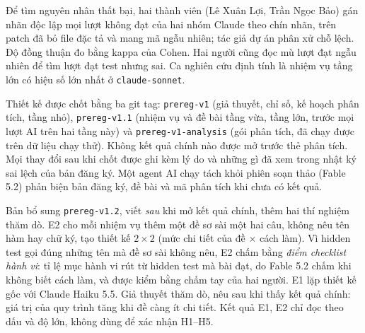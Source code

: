 Để tìm nguyên nhân thất bại, hai thành viên (Lê Xuân Lợi, Trần Ngọc Bảo) gán nhãn độc lập mọi lượt
không đạt của hai nhóm Claude theo chín nhãn, trên patch đã bỏ file đặc tả và mang mã ngẫu nhiên; tác giả dự
án phân xử chỗ lệch. Độ đồng thuận đo bằng kappa của Cohen. Hai người cũng đọc mù \NumPassCheckRuns{} lượt đạt
ngẫu nhiên để tìm lượt đạt test nhưng sai. Ca nghiên cứu định tính là nhiệm vụ tầng lớn có hiệu số lớn nhất ở
\texttt{claude-sonnet}.

\label{sec:prereg}Thiết kế được chốt bằng ba git tag: \texttt{prereg-v1} (giả thuyết, chỉ số, kế hoạch phân tích, tầng nhỏ),
\texttt{prereg-v1.1} (nhiệm vụ và đề bài tầng vừa, tầng lớn, trước mọi lượt AI trên hai tầng này) và
\texttt{prereg-v1-analysis} (gói phân tích, đã chạy được trên dữ liệu chạy thử). Không kết quả chính nào được
mở trước thẻ phân tích. Mọi thay đổi sau khi chốt được ghi kèm lý do và những gì đã xem
trong nhật ký sai lệch của bản đăng ký. Một agent AI chạy tách khỏi phiên soạn thảo (Fable 5.2) phản biện bản đăng
ký, đề bài và mã phân tích khi chưa có kết quả.

Bản bổ sung \texttt{prereg-v1.2}, viết \emph{sau} khi mở kết quả chính, thêm hai thí nghiệm thăm dò. E2 cho
mỗi nhiệm vụ thêm một đề sơ sài một hai câu, không nêu tên hàm hay chữ ký, tạo thiết kế $2\times 2$ (mức chi
tiết của đề $\times$ cách làm). Vì hidden test gọi đúng những tên mà đề sơ sài không nêu, E2 chấm bằng \emph{điểm
checklist hành vi}: tỉ lệ mục hành vi rút từ hidden test mà bài đạt, do Fable 5.2 chấm khi không biết cách làm, và
được kiểm bằng chấm tay của hai người. E1 lặp thiết kế gốc với Claude Haiku 5.5. Giả thuyết thăm dò, nêu sau
khi thấy kết quả chính: giá trị của quy trình tăng khi đề càng ít chi tiết. Kết quả E1, E2 chỉ đọc theo dấu và
độ lớn, không dùng để xác nhận H1--H5.
